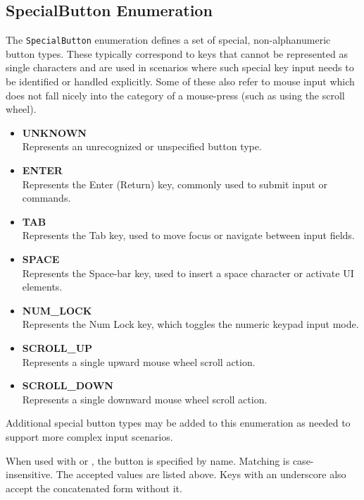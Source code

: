 \subsection{SpecialButton Enumeration} \label{SpecialButton-Enumeration}

The \texttt{SpecialButton} enumeration defines a set of special, non-alphanumeric button types. These typically correspond to keys that cannot be represented as single characters and are used in scenarios where such special key input needs to be identified or handled explicitly. Some of these also refer to mouse input which does not fall nicely into the category of a mouse-press (such as using the scroll wheel).

\begin{itemize}
	\item \textbf{UNKNOWN} \hfill \\
	Represents an unrecognized or unspecified button type.

	\item \textbf{ENTER} \hfill \\
	Represents the Enter (Return) key, commonly used to submit input or commands.

	\item \textbf{TAB} \hfill \\
	Represents the Tab key, used to move focus or navigate between input fields.

	\item \textbf{SPACE} \hfill \\
	Represents the Space-bar key, used to insert a space character or activate UI elements.

	\item \textbf{NUM\_LOCK} \hfill \\
	Represents the Num Lock key, which toggles the numeric keypad input mode.

	\item \textbf{SCROLL\_UP} \hfill \\
	Represents a single upward mouse wheel scroll action.

	\item \textbf{SCROLL\_DOWN} \hfill \\
	Represents a single downward mouse wheel scroll action.
\end{itemize}

\noindent Additional special button types may be added to this enumeration as needed to support more complex input scenarios.

\noindent When used with  or , the button is specified by name. Matching is case-insensitive. The accepted values are listed above. Keys with an underscore also accept the concatenated form without it.


